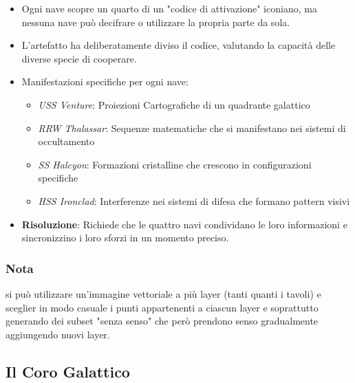 \documentclass[letterpaper,twocolumn,openany,nodeprecatedcode]{dndbook}
\begin{document}
\begin{itemize}
    \item Ogni nave scopre un quarto di un "codice di attivazione" iconiano, ma nessuna nave può decifrare o utilizzare la propria parte da sola.
    \item L'artefatto ha deliberatamente diviso il codice, valutando la capacità delle diverse specie di cooperare.
    \item Manifestazioni specifiche per ogni nave:

    \begin{itemize}
    \item \textit{USS Venture}: Proiezioni Cartografiche di un quadrante galattico
    \item \textit{RRW Thalassar}: Sequenze matematiche che si manifestano nei sistemi di occultamento
    \item \textit{SS Halcyon}: Formazioni cristalline che crescono in configurazioni specifiche
    \item \textit{HSS Ironclad}: Interferenze nei sistemi di difesa che formano pattern visivi
\end{itemize}

    \item \textbf{Risoluzione}: Richiede che le quattro navi condividano le loro informazioni e sincronizzino i loro sforzi in un momento preciso.
\end{itemize}

\subsubsection{Nota}
si può utilizzare un'immagine vettoriale a più layer (tanti quanti i tavoli) e sceglier in modo casuale i punti appartenenti a ciascun layer e soprattutto generando dei subset "senza senso" che però prendono senso gradualmente aggiungendo nuovi layer. 

\subsection{Il Coro Galattico}
\end{document}
